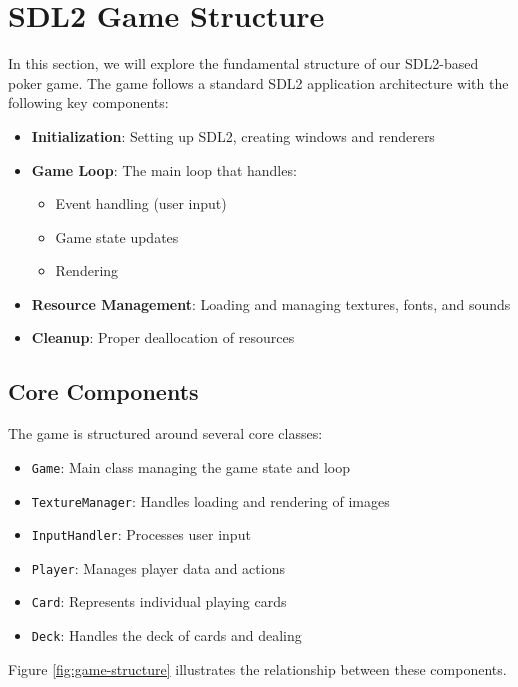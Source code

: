
\section{SDL2 Game Structure}
\label{sec:SDL2-Game-Structure-section}

In this section, we will explore the fundamental structure of our SDL2-based poker game. The game follows a standard SDL2 application architecture with the following key components:

\begin{itemize}
    \item \textbf{Initialization}: Setting up SDL2, creating windows and renderers
    \item \textbf{Game Loop}: The main loop that handles:
        \begin{itemize}
            \item Event handling (user input)
            \item Game state updates
            \item Rendering
        \end{itemize}
    \item \textbf{Resource Management}: Loading and managing textures, fonts, and sounds
    \item \textbf{Cleanup}: Proper deallocation of resources
\end{itemize}

\subsection{Core Components}
The game is structured around several core classes:

\begin{itemize}
    \item \texttt{Game}: Main class managing the game state and loop
    \item \texttt{TextureManager}: Handles loading and rendering of images
    \item \texttt{InputHandler}: Processes user input
    \item \texttt{Player}: Manages player data and actions
    \item \texttt{Card}: Represents individual playing cards
    \item \texttt{Deck}: Handles the deck of cards and dealing
\end{itemize}

Figure \ref{fig:game-structure} illustrates the relationship between these components.

